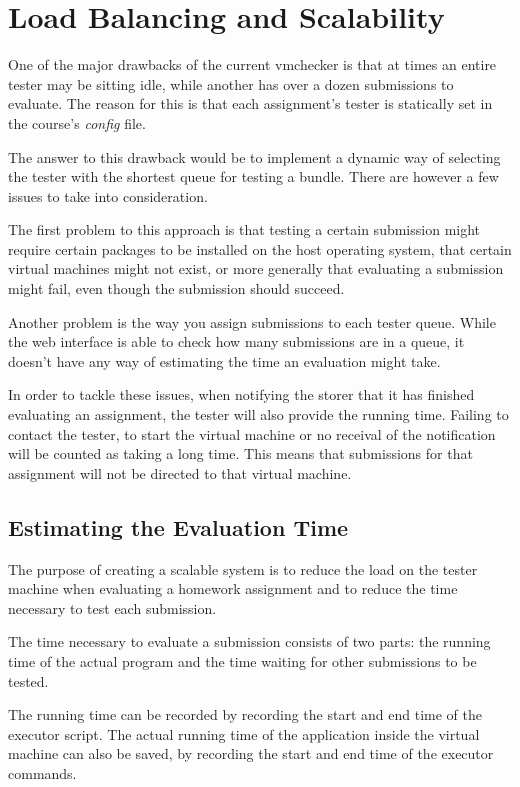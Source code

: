 \chapter{Load Balancing and Scalability}
\label{chapter:virt-load}

One of the major drawbacks of the current vmchecker is that at times an entire
tester may be sitting idle, while another has over a dozen submissions to
evaluate. The reason for this is that each assignment's tester is statically
set in the course's \textit{config} file. 

The answer to this drawback would be to implement a dynamic way of selecting
the tester with the shortest queue for testing a bundle. There are however a 
few issues to take into consideration.

The first problem to this approach is that testing a certain submission might
require certain packages to be installed on the host operating system, 
that certain virtual machines might not exist, or more generally that
evaluating a submission might fail, even though the submission should
succeed.

Another problem is the way you assign submissions to each tester queue. 
While the web interface is able to check how many submissions are in a queue,
it doesn't have any way of estimating the time an evaluation might take.

In order to tackle these issues, when notifying the storer that it has finished
evaluating an assignment, the tester will also provide the running time. 
Failing to contact the tester, to start the virtual machine or no receival of
the notification will be counted as taking a long time. This means that submissions
for that assignment will not be directed to that virtual machine.


\section{Estimating the Evaluation Time}
\label{sec:vmc-estimating}

The purpose of creating a scalable system is to reduce the load on the 
tester machine when evaluating a homework assignment and to reduce the time necessary
to test each submission.

The time necessary to evaluate a submission consists of two parts: the running
time of the actual program and the time waiting for other submissions to be tested.

The running time can be recorded by recording the start and end time of the 
executor script. The actual running time of the application inside the virtual
machine can also be saved, by recording the start and end time of the executor commands.

